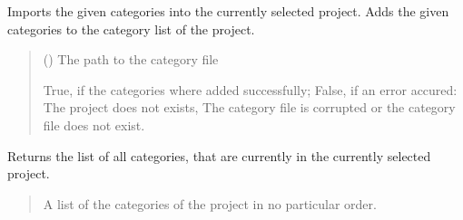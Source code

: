 \documentclass[letterpaper,10pt,english]{sphinxmanual}
\begin{document}
\begin{fulllineitems}
\begin{fulllineitems}
\label{\detokenize{apidoc/src.osm_configurator.control:src.osm_configurator.control.category_controller.CategoryController.import_category_configuration}}
\pysigstartsignatures
{}
\pysigstopsignatures
\sphinxAtStartPar
Imports the given categories into the currently selected project.
Adds the given categories to the category list of the project.
\begin{quote}\begin{description}
\sphinxAtStartPar
{} () \textendash{} The path to the category file

\sphinxAtStartPar
True, if the categories where added successfully; False, if an error accured: The project does not exists, The category file is corrupted or the category file does not exist.

\sphinxAtStartPar
{}

\end{description}\end{quote}

\end{fulllineitems}


\begin{fulllineitems}
\label{\detokenize{apidoc/src.osm_configurator.control:src.osm_configurator.control.category_controller.CategoryController.get_list_of_categories}}
\pysigstartsignatures
{}
\pysigstopsignatures
\sphinxAtStartPar
Returns the list of all categories, that are currently in the currently selected project.
\begin{quote}\begin{description}
\sphinxAtStartPar
A list of the categories of the project in no particular order.

\sphinxAtStartPar
{}


\end{description}
\end{quote}
\end{fulllineitems}
\end{fulllineitems}
\end{document}
